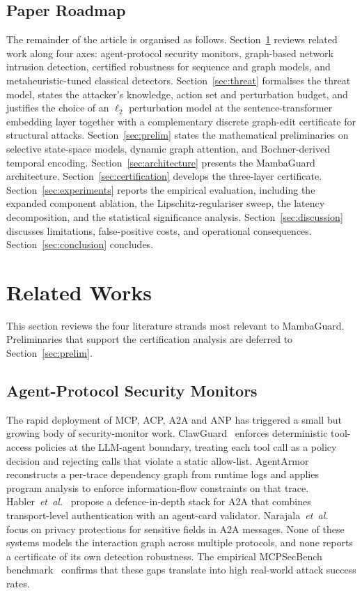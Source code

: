 \documentclass{ieeeaccess}
\begin{document}
\subsection{Paper Roadmap}
\label{sec:roadmap}
The remainder of the article is organised as follows. Section~\ref{sec:related} reviews related work along four axes: agent-protocol security monitors, graph-based network intrusion detection, certified robustness for sequence and graph models, and metaheuristic-tuned classical detectors. Section~\ref{sec:threat} formalises the threat model, states the attacker's knowledge, action set and perturbation budget, and justifies the choice of an $\ell_{2}$ perturbation model at the sentence-transformer embedding layer together with a complementary discrete graph-edit certificate for structural attacks. Section~\ref{sec:prelim} states the mathematical preliminaries on selective state-space models, dynamic graph attention, and Bochner-derived temporal encoding. Section~\ref{sec:architecture} presents the MambaGuard architecture. Section~\ref{sec:certification} develops the three-layer certificate. Section~\ref{sec:experiments} reports the empirical evaluation, including the expanded component ablation, the Lipschitz-regulariser sweep, the latency decomposition, and the statistical significance analysis. Section~\ref{sec:discussion} discusses limitations, false-positive costs, and operational consequences. Section~\ref{sec:conclusion} concludes.

\section{Related Works}
\label{sec:related}
This section reviews the four literature strands most relevant to MambaGuard. Preliminaries that support the certification analysis are deferred to Section~\ref{sec:prelim}.

\subsection{Agent-Protocol Security Monitors}
The rapid deployment of MCP, ACP, A2A and ANP has triggered a small but growing body of security-monitor work. ClawGuard~\cite{Zhao2026ClawGuard} enforces deterministic tool-access policies at the LLM-agent boundary, treating each tool call as a policy decision and rejecting calls that violate a static allow-list. AgentArmor~\cite{Wang2025AgentArmor} reconstructs a per-trace dependency graph from runtime logs and applies program analysis to enforce information-flow constraints on that trace. Habler~\textit{et~al.}~\cite{Habler2025A2A} propose a defence-in-depth stack for A2A that combines transport-level authentication with an agent-card validator. Narajala~\textit{et~al.}~\cite{Narajala2025A2A} focus on privacy protections for sensitive fields in A2A messages. None of these systems models the interaction graph across multiple protocols, and none reports a certificate of its own detection robustness. The empirical MCPSecBench benchmark~\cite{Yang2025MCPSec} confirms that these gaps translate into high real-world attack success rates.
\end{document}
